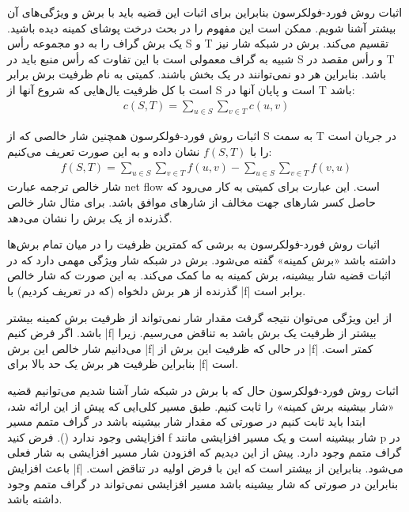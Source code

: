 \begin{itemframe}{اثبات روش فورد-فولکرسون}
\itm
بنابراین برای اثبات این قضیه باید با برش
 و ویژگی‌های آن بیشتر آشنا شویم. ممکن است این مفهوم را در بحث درخت پوشای کمینه دیده باشید. یک برش گراف را به دو مجموعه رأس S و T تقسیم می‌کند. برش در شبکه شار نیز شبیه به گراف معمولی است با این تفاوت که رأس منبع باید در S و رأس مقصد در T‌ باشد. بنابراین هر دو نمی‌توانند در یک بخش باشند.
\itm
کمیتی به نام ظرفیت برش برابر است با کل ظرفیت یال‌هایی که شروع آنها از S است و پایان آنها در T باشد:
\begin{align*}
c(S, T) = \sum_{u \in S}  \sum_{v \in T} c(u, v)
\end{align*}

\end{itemframe}


\begin{itemframe}{اثبات روش فورد-فولکرسون}
\itm
همچنین شار خالصی
 که از S به سمت T در جریان است را با
$f(S, T)$
نشان داده و به این صورت تعریف می‌کنیم:
\begin{align}
f(S, T) = \sum_{u \in S}  \sum_{v \in T} f(u, v)  - \sum_{u \in S}  \sum_{v \in T} f(v, u)
\label{cut-net-flow}
\end{align}
\itm
شار خالص ترجمه عبارت net flow است. این عبارت برای کمیتی به کار می‌رود که حاصل کسر شارهای جهت مخالف از شارهای موافق باشد. برای مثال  شار خالص گذرنده از یک برش را نشان می‌دهد.
\end{itemframe}


\begin{itemframe}{اثبات روش فورد-فولکرسون}
\itm
به برشی که کمترین ظرفیت را در میان تمام برش‌ها داشته باشد «برش کمینه»
 گفته می‌شود.
\itm
برش در شبکه شار ویژگی مهمی دارد که در اثبات قضیه شار بیشینه، برش کمینه به ما کمک می‌کند. به این صورت که شار خالص گذرنده از هر برش دلخواه (که در  تعریف کردیم) با |f| برابر است.

\itm
از این ویژگی می‌توان نتیجه گرفت مقدار شار نمی‌تواند از ظرفیت برش کمینه بیشتر باشد. اگر فرض کنیم |f| بیشتر از ظرفیت یک برش باشد به تناقض می‌رسیم. زیرا می‌دانیم شار خالص این برش |f| در  حالی که ظرفیت این برش از |f| کمتر است.
\itm
بنابراین ظرفیت هر برش یک حد بالا برای |f| است.
\end{itemframe}


\begin{itemframe}{اثبات روش فورد-فولکرسون}
\itm
حال که با برش در شبکه شار آشنا شدیم می‌توانیم قضیه «شار بیشینه برش کمینه» را ثابت کنیم. طبق مسیر کلی‌ایی که پیش از این ارائه شد، ابتدا باید ثابت کنیم در صورتی که مقدار شار بیشینه باشد در گراف متمم مسیر افزایشی وجود ندارد ().
\itm
فرض کنید f شار بیشینه است و یک مسیر افزایشی مانند p در گراف متمم وجود دارد. پیش از این دیدیم که افزودن شار مسیر افزایشی به شار فعلی باعث افزایش |f| می‌شود. بنابراین   از  بیشتر است که این با فرض اولیه در تناقض است. بنابراین در صورتی که شار بیشینه باشد مسیر افزایشی نمی‌تواند در گراف متمم وجود داشته باشد.
\end{itemframe}

